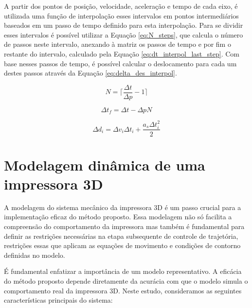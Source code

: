 A partir dos pontos de posição, velocidade, aceleração e tempo de cada eixo, é utilizada uma função de interpolação esses intervalos em pontos intermediários baseados em um passo de tempo definido para esta interpolação. Para se dividir esses intervalos é possível utilizar a Equação \ref{eq:N_steps}, que calcula o número de passos neste intervalo, anexando à matriz os passos de tempo e por fim o restante do intervalo, calculado pela Equação \ref{eq:dt_interpol_last_step}. Com base nesses passos de tempo, é possível calcular o deslocamento para cada um destes passos através da Equação \ref{eq:delta_des_interpol}.

\begin{equation}
    \label{eq:N_steps}
    N = \lceil\frac{\Delta t}{\Delta p}-1\rceil
\end{equation}

\begin{equation}
    \label{eq:dt_interpol_last_step}
    \Delta t_f= \Delta t - \Delta p N 
\end{equation}

\begin{equation}
    \label{eq:delta_des_interpol}
    \Delta d_i = \Delta v_i \Delta t_i+ \frac{a_s \Delta t_i^2}{2} 
\end{equation}



\section{Modelagem dinâmica de uma impressora 3D}

A modelagem do sistema mecânico da impressora 3D é um passo crucial para a implementação eficaz do método proposto. Essa modelagem não só facilita a compreensão do comportamento da impressora mas também é fundamental para definir as restrições necessárias na etapa subsequente de controle de trajetória, restrições essas que aplicam as equações de movimento e condições de contorno definidas no modelo.

É fundamental enfatizar a importância de um modelo representativo. A eficácia do método proposto depende diretamente da acurácia com que o modelo simula o comportamento real da impressora 3D. Neste estudo, consideramos as seguintes características principais do sistema:

